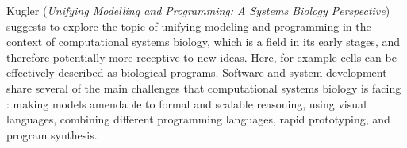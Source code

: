 


Kugler
\cite{isola-2016-kugler}
({\em Unifying Modelling and Programming: A Systems Biology Perspective})
suggests to explore the topic of unifying modeling and programming
in the context of computational systems biology, which is a field 
in its early stages, and therefore potentially more receptive to 
new ideas. Here, for example cells
can be effectively described as biological programs.
Software and system development share several of the main 
challenges that computational systems
biology is facing : 
making models amendable to formal and scalable reasoning,
using visual languages, combining different programming
languages, rapid prototyping, and program synthesis.


